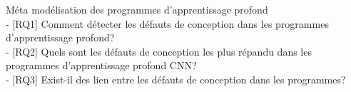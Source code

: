 Méta modélisation des programmes d'apprentissage profond\\


- [RQ1] Comment détecter les défauts de conception dans les programmes d'apprentissage
profond?\\ %
- [RQ2] Quels sont les défauts de conception les plus répandu dans les programmes
d'apprentissage profond CNN?\\ %
- [RQ3] Exist-il des lien entre les défauts de conception dans les programmes? %


